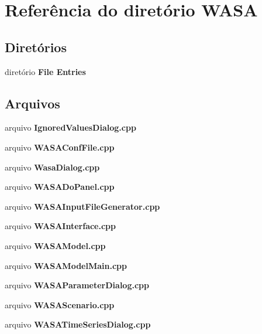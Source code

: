 \section{Referência do diretório W\+A\+SA}
\label{dir_0e00a156f444da2a22c701cdbb3ed339}
\subsection*{Diretórios}
\begin{DoxyCompactItemize}
\item 
diretório {\bf File Entries}
\end{DoxyCompactItemize}
\subsection*{Arquivos}
\begin{DoxyCompactItemize}
\item 
arquivo {\bf Ignored\+Values\+Dialog.\+cpp}
\item 
arquivo {\bf W\+A\+S\+A\+Conf\+File.\+cpp}
\item 
arquivo {\bf Wasa\+Dialog.\+cpp}
\item 
arquivo {\bf W\+A\+S\+A\+Do\+Panel.\+cpp}
\item 
arquivo {\bf W\+A\+S\+A\+Input\+File\+Generator.\+cpp}
\item 
arquivo {\bf W\+A\+S\+A\+Interface.\+cpp}
\item 
arquivo {\bf W\+A\+S\+A\+Model.\+cpp}
\item 
arquivo {\bf W\+A\+S\+A\+Model\+Main.\+cpp}
\item 
arquivo {\bf W\+A\+S\+A\+Parameter\+Dialog.\+cpp}
\item 
arquivo {\bf W\+A\+S\+A\+Scenario.\+cpp}
\item 
arquivo {\bf W\+A\+S\+A\+Time\+Series\+Dialog.\+cpp}
\end{DoxyCompactItemize}
